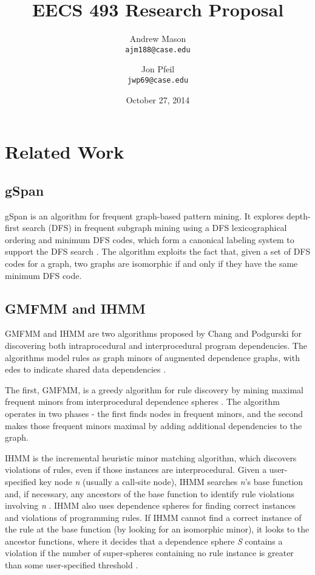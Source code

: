 \documentclass[12pt]{article}
\title{EECS 493 Research Proposal}
\author{
    Andrew Mason\\
    \texttt{ajm188@case.edu}
    \and
    Jon Pfeil\\
    \texttt{jwp69@case.edu}
}
\date{October 27, 2014}
\begin{document}
\maketitle
\tableofcontents
\pagebreak

\section{Related Work}
\subsection{gSpan}
gSpan is an algorithm for frequent graph-based pattern mining. It explores depth-first  search (DFS) in frequent subgraph mining using a DFS lexicographical ordering and minimum DFS codes, which form a canonical labeling system to support the DFS search \cite{Yan:2002:GGS:844380.844811}. The algorithm exploits the fact that, given a set of DFS codes for a graph, two graphs are isomorphic if and only if they have the same minimum DFS code.

\subsection{GMFMM and IHMM}
GMFMM and IHMM are two algorithms proposed by Chang and Podgurski for discovering both intraprocedural and interprocedural program dependencies. The algorithms model rules as graph minors of augmented dependence graphs, with edes to indicate shared data dependencies \cite{DBLP:journals/smr/ChangP12}.

The first, GMFMM, is a greedy algorithm for rule discovery by mining maximal frequent minors from interprocedural dependence spheres \cite{DBLP:journals/smr/ChangP12}. The algorithm operates in two phases - the first finds nodes in frequent minors, and the second makes those frequent minors maximal by adding additional dependencies to the graph.

IHMM is the incremental heuristic minor matching algorithm, which discovers violations of rules, even if those instances are interprocedural. Given a user-specified key node \textit{n} (usually a call-site node), IHMM searches \textit{n}'s base function and, if necessary, any ancestors of the base function to identify rule violations involving \textit{n} \cite{DBLP:journals/smr/ChangP12}. IHMM also uses dependence spheres for finding correct instances and violations of programming rules. If IHMM cannot find a correct instance of the rule at the base function (by looking for an isomorphic minor), it looks to the ancestor functions, where it decides that a dependence sphere \textit{S} contains a violation if the number of super-spheres containing no rule instance is greater than some user-specified threshold \cite{DBLP:journals/smr/ChangP12}.
\end{document}

